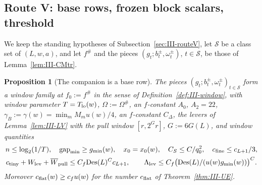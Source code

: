 \documentclass[10pt]{amsart}
\newtheorem{proposition}[theorem]{Proposition}
\theoremstyle{definition}
\theoremstyle{remark}
\newcommand{\gap}{\operatorname{gap}}
\begin{document}
\subsection{Route V: base rows, frozen block scalars, threshold}\label{subsec:III-BRPM}

We keep the standing hypotheses of Subsection~\ref{sec:III-routeV}, let
$\mathcal S$ be a class set of $(L,w,a)$, and let $f^\#$ and the pieces
$(g_t;b^\pm_t,\omega^\pm_t)$, $t\in\mathcal S$, be those of
Lemma~\ref{lem:III-CMtr}.

\begin{proposition}[The companion is a base row]\label{prop:III-BR}
The pieces $(g_t;b^\pm_t,\omega^\pm_t)_{t\in\mathcal S}$ form a window family at
$f_0:=f^\#$ in the sense of Definition~\textup{\ref{def:III-window}}, with window
parameter $T=T_{\rm lo}(w)$, $\Omega:=\Omega^\#$, an $f$-constant $A_0$, $A_2=22$,
$\gamma_B:=\gamma(w)=\min_mM_mu(w)/4$, an $f$-constant $C_\Delta$, the levers of
Lemma~\textup{\ref{lem:III-LV}} with the pull window $[r,2^{G}r]$, $G:=6G(L)$, and
window quantities
\[
\begin{gathered}
 n\le\log_2(1/T),\quad\gap_{\min}\ge g_{\min}(w),\quad x_0=x_0(w),\quad
 C_S\le C/q_0^2,\quad c_{\rm fine}\le c_{L+1}/3,\\
 c_{\rm tiny}+W_{\rm lev}+\overline W_{\rm pull}\le C_f\mathrm{Des}(L)^Cc_{L+1},\qquad
 \Lambda_{\rm lev}\le C_f\big(\mathrm{Des}(L)/(u(w)g_{\min}(w))\big)^C .
\end{gathered}
\]
Moreover $c_{\rm flat}(w)\ge c_fu(w)$ for the number $c_{\rm flat}$ of
Theorem~\textup{\ref{thm:III-UE}}.
\end{proposition}
\end{document}
